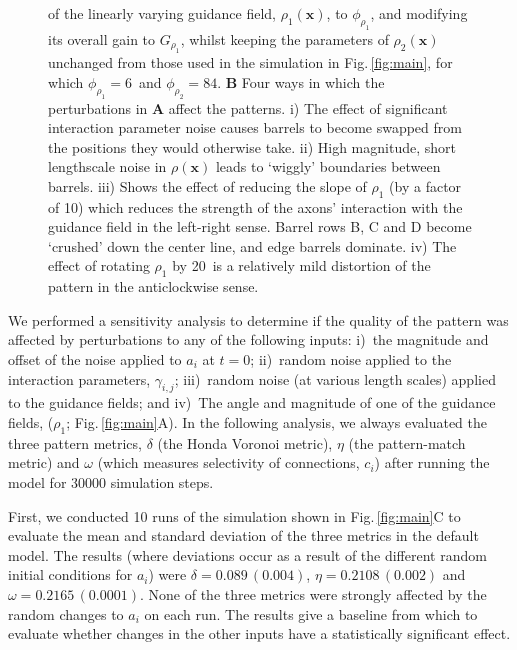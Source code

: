 \documentclass[9pt,lineno]{elife}
\newcommand{\sensitivity}[1]{\textcolor{revgblack}{#1}}
\newcommand{\mb}[1]{\mathbf{#1}}
\begin{document}
\begin{figure}
\begin{fullwidth}
{{        of the linearly varying guidance field, $\rho_1(\mb{x})$, to $\phi_{\rho_1}$,
        and modifying its overall gain to $G_{\rho_1}$, whilst keeping the
        parameters of $\rho_2(\mb{x})$
        unchanged from those used in the simulation in
        Fig.\,\ref{fig:main}, for which $\phi_{\rho_1}=6$\textdegree~and
        $\phi_{\rho_2}=84$\textdegree.
        \textbf{B} Four ways in which the perturbations in \textbf{A} affect
        the patterns. i) The effect of significant interaction parameter noise
        causes barrels to become swapped from the positions they would
        otherwise take. ii) High magnitude, short lengthscale noise in
        $\rho(\mb{x})$ leads to `wiggly' boundaries between barrels. iii)
        Shows the effect of reducing the slope of $\rho_1$ (by a factor of 10)
        which reduces the strength of the axons' interaction with the guidance
        field in the left-right sense. Barrel rows B, C and D become `crushed'
        down the center line, and edge barrels dominate. iv) The effect of
        rotating $\rho_1$ by 20\textdegree~is a relatively mild distortion of
        the pattern in the anticlockwise sense.
      }
    }
    \label{fig:sens}
  \end{fullwidth}
\end{figure}

\sensitivity{We performed a sensitivity analysis to determine if the quality of the
  pattern was affected by perturbations to any of the following inputs:
%
  i)~the magnitude and offset of the noise applied to $a_i$ at $t=0$;
%
  ii)~random noise applied to the interaction parameters, $\gamma_{i,j}$;
%
  iii)~random noise (at various length scales) applied to the guidance fields;
%
  and
%
  iv)~The angle and magnitude of one of the guidance fields, ($\rho_1$;
  Fig.\,\ref{fig:main}A).
%
  In the following analysis, we always evaluated the three pattern metrics,
  $\delta$ (the Honda Voronoi metric), $\eta$ (the pattern-match metric) and
  $\omega$ (which measures selectivity of connections, $c_i$) after running
  the model for 30000 simulation steps.}

\sensitivity{First, we conducted 10 runs of the simulation shown in
  Fig.\,\ref{fig:main}C to evaluate the mean and standard deviation of the
  three metrics in the default model. The
  results (where deviations occur as a result of the different random initial
  conditions for $a_i$) were $\delta=0.089\,(0.004)$, $\eta=0.2108\,(0.002)$ and
  $\omega=0.2165\,(0.0001)$. None of the three metrics were strongly affected
  by the random changes to $a_i$ on each run. The results give a baseline from
  which to evaluate whether changes in the other inputs have a statistically
  significant effect.}
\end{document}
